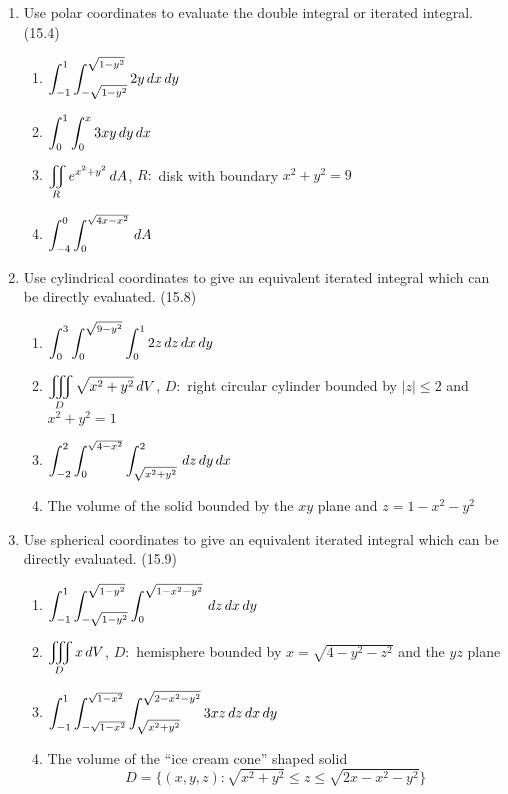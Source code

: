 \begin{enumerate}
    \newpage

    \item Use polar coordinates to evaluate the double integral or iterated integral. (15.4)

      \begin{enumerate}
        \item $\displaystyle\int_{-1}^1\int_{-\sqrt{1-y^2}}^{\sqrt{1-y^2}} 2y\,d{x}\,d{y}$
        \item $\displaystyle\int_0^1\int_0^x 3xy\,d{y}\,d{x}$
        \item $\displaystyle\iint_R e^{x^2+y^2}\,d{A}$, $R:$ disk with boundary $x^2+y^2=9$
        \item $\displaystyle\int_{-4}^0\int_0^{\sqrt{4x-x^2}} \,d{A}$
      \end{enumerate}

    \item Use cylindrical coordinates to give an equivalent iterated integral which can be directly evaluated. (15.8)

      \begin{enumerate}
        \item $\displaystyle\int_0^3\int_0^{\sqrt{9-y^2}}\int_0^1 2z\,d{z}\,d{x}\,d{y}$
        \item $\displaystyle\iiint_D \sqrt{x^2+y^2}\,d{V}$, $D:$ right circular cylinder bounded by $|z|\leq 2$ and $x^2+y^2=1$
        \item $\displaystyle\int_{-2}^2\int_0^{\sqrt{4-x^2}}\int_{\sqrt{x^2+y^2}}^2 \,d{z}\,d{y}\,d{x}$
        \item The volume of the solid bounded by the $xy$ plane and $z=1-x^2-y^2$
      \end{enumerate}

    \item Use spherical coordinates to give an equivalent iterated integral which can be directly evaluated. (15.9)

      \begin{enumerate}
        \item $\displaystyle\int_{-1}^1\int_{-\sqrt{1-y^2}}^{\sqrt{1-y^2}}\int_0^{\sqrt{1-x^2-y^2}} \,d{z}\,d{x}\,d{y}$
        \item $\displaystyle\iiint_D x\,d{V}$, $D:$ hemisphere bounded by $x=\sqrt{4-y^2-z^2}$ and the $yz$ plane
        \item $\displaystyle\int_{-1}^{1}\int_{-\sqrt{1-x^2}}^{\sqrt{1-x^2}}\int_{\sqrt{x^2+y^2}}^{\sqrt{2-x^2-y^2}}3xz\,d{z}\,d{x}\,d{y}$
        \item The volume of the ``ice cream cone'' shaped solid \[D = \{(x,y,z): \sqrt{x^2+y^2} \leq z\leq \sqrt{2x-x^2-y^2}\}\]
      \end{enumerate}


\end{enumerate}
